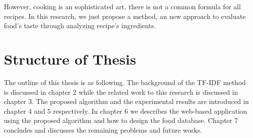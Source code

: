 However, cooking is an sophisticated art, there is not a common formula for all recipes. In this research, we just propose a method, an new approach to evaluate food's taste through analyzing recipe's ingredients.

\section{Structure of Thesis}\label{sec:intro_structure}

\par The outline of this thesis is as following. The background of the TF-IDF method is discussed in chapter 2 while the related work to this research is discussed in chapter 3. The proposed algorithm and the experimental results are introduced in chapter 4 and 5 respectively. In chapter 6 we describes the web-based application using the proposed algorithm and how to design the food database. Chapter 7 concludes and discusses the remaining problems and future works.

 